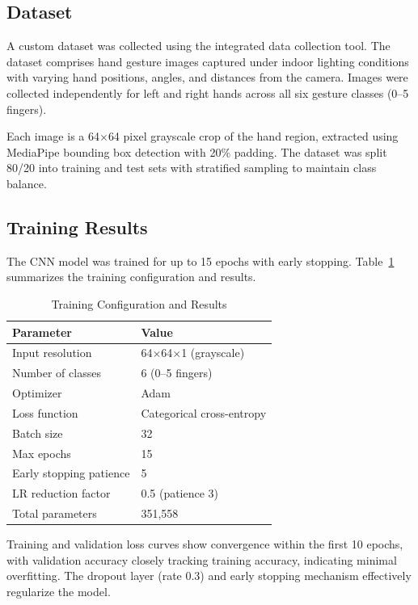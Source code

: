 \documentclass[conference]{IEEEtran}
\begin{document}
\subsection{Dataset}

A custom dataset was collected using the integrated data collection tool. The dataset comprises hand gesture images captured under indoor lighting conditions with varying hand positions, angles, and distances from the camera. Images were collected independently for left and right hands across all six gesture classes (0--5 fingers).

Each image is a 64$\times$64 pixel grayscale crop of the hand region, extracted using MediaPipe bounding box detection with 20\% padding. The dataset was split 80/20 into training and test sets with stratified sampling to maintain class balance.

\subsection{Training Results}

The CNN model was trained for up to 15 epochs with early stopping. Table~\ref{tab:training_results} summarizes the training configuration and results.

\begin{table}[htbp]
\caption{Training Configuration and Results}
\label{tab:training_results}
\centering
\begin{tabular}{ll}
\toprule
\textbf{Parameter} & \textbf{Value} \\
\midrule
Input resolution & 64$\times$64$\times$1 (grayscale) \\
Number of classes & 6 (0--5 fingers) \\
Optimizer & Adam \\
Loss function & Categorical cross-entropy \\
Batch size & 32 \\
Max epochs & 15 \\
Early stopping patience & 5 \\
LR reduction factor & 0.5 (patience 3) \\
Total parameters & 351,558 \\
\bottomrule
\end{tabular}
\end{table}

Training and validation loss curves show convergence within the first 10 epochs, with validation accuracy closely tracking training accuracy, indicating minimal overfitting. The dropout layer (rate 0.3) and early stopping mechanism effectively regularize the model.
\end{document}
